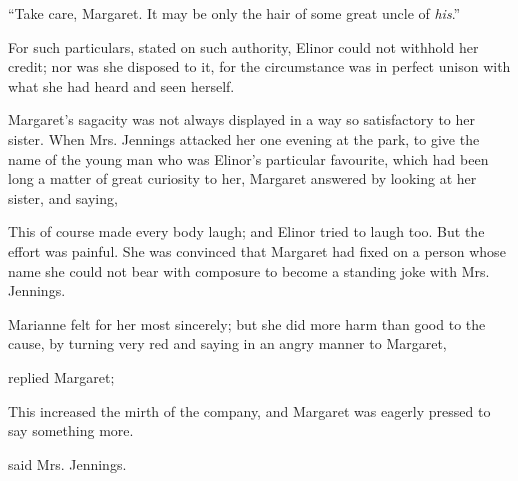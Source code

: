 
“Take care, Margaret. It may be only the hair of some great uncle of {\em his}.”


For such particulars, stated on such authority, Elinor could not withhold her credit; nor was she disposed to it, for the circumstance was in perfect unison with what she had heard and seen herself.

Margaret's sagacity was not always displayed in a way so satisfactory to her sister. When Mrs. Jennings attacked her one evening at the park, to give the name of the young man who was Elinor's particular favourite, which had been long a matter of great curiosity to her, Margaret answered by looking at her sister, and saying, 

This of course made every body laugh; and Elinor tried to laugh too. But the effort was painful. She was convinced that Margaret had fixed on a person whose name she could not bear with composure to become a standing joke with Mrs. Jennings.

Marianne felt for her most sincerely; but she did more harm than good to the cause, by turning very red and saying in an angry manner to Margaret,


 replied Margaret; 

This increased the mirth of the company, and Margaret was eagerly pressed to say something more.

 said Mrs. Jennings. 


